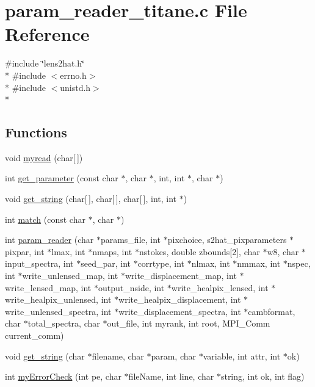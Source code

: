 \section{param\-\_\-reader\-\_\-titane.\-c File Reference}
\label{src__rng_2test__param__reader_2param__reader__titane_8c}
{\ttfamily \#include \char`\"{}lens2hat.\-h\char`\"{}}\\*
{\ttfamily \#include $<$errno.\-h$>$}\\*
{\ttfamily \#include $<$unistd.\-h$>$}\\*
\subsection*{Functions}
\begin{DoxyCompactItemize}
\item 
void \hyperlink{src__rng_2test__param__reader_2param__reader__titane_8c_a50c0568f618886d78986c4a9d6a23ba4}{myread} (char\mbox{[}$\,$\mbox{]})
\item 
int \hyperlink{src__rng_2test__param__reader_2param__reader__titane_8c_aa58f4ecc3318546d08e4282c739db7a3}{get\-\_\-parameter} (const char $\ast$, char $\ast$, int, int $\ast$, char $\ast$)
\item 
void \hyperlink{src__rng_2test__param__reader_2param__reader__titane_8c_acdf8e6c6f50db79679922d3dbf74dd84}{get\-\_\-string} (char\mbox{[}$\,$\mbox{]}, char\mbox{[}$\,$\mbox{]}, char\mbox{[}$\,$\mbox{]}, int, int $\ast$)
\item 
int \hyperlink{src__rng_2test__param__reader_2param__reader__titane_8c_af71971b64e93dd85136d531400035e57}{match} (const char $\ast$, char $\ast$)
\item 
int \hyperlink{src__rng_2test__param__reader_2param__reader__titane_8c_a990ccd7e0b3352322502e77838c159d7}{param\-\_\-reader} (char $\ast$params\-\_\-file, int $\ast$pixchoice, s2hat\-\_\-pixparameters $\ast$pixpar, int $\ast$lmax, int $\ast$nmaps, int $\ast$nstokes, double zbounds\mbox{[}2\mbox{]}, char $\ast$w8, char $\ast$input\-\_\-spectra, int $\ast$seed\-\_\-par, int $\ast$corrtype, int $\ast$nlmax, int $\ast$nmmax, int $\ast$nspec, int $\ast$write\-\_\-unlensed\-\_\-map, int $\ast$write\-\_\-displacement\-\_\-map, int $\ast$write\-\_\-lensed\-\_\-map, int $\ast$output\-\_\-nside, int $\ast$write\-\_\-healpix\-\_\-lensed, int $\ast$write\-\_\-healpix\-\_\-unlensed, int $\ast$write\-\_\-healpix\-\_\-displacement, int $\ast$write\-\_\-unlensed\-\_\-spectra, int $\ast$write\-\_\-displacement\-\_\-spectra, int $\ast$cambformat, char $\ast$total\-\_\-spectra, char $\ast$out\-\_\-file, int myrank, int root, M\-P\-I\-\_\-\-Comm current\-\_\-comm)
\item 
void \hyperlink{src__rng_2test__param__reader_2param__reader__titane_8c_a1be51b19c79f5c49c6ce2128259fc093}{get\-\_\-string} (char $\ast$filename, char $\ast$param, char $\ast$variable, int attr, int $\ast$ok)
\item 
int \hyperlink{src__rng_2test__param__reader_2param__reader__titane_8c_a70bcbd531a6e4abc62d73f5b4532c2cc}{my\-Error\-Check} (int pe, char $\ast$file\-Name, int line, char $\ast$string, int ok, int flag)
\end{DoxyCompactItemize}


